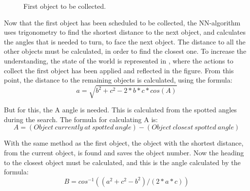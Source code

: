 \begin{figure}[H]
     \caption{\label{fig:object_navigation_first} First object to be collected.}
\end{figure}

Now that the first object has been scheduled to be collected, the NN-algorithm uses trigonometry to find the shortest distance to the next object, and calculates the angles that is needed to turn, to face the next object. The distance to all the other objects must be calculated, in order to find the closest one. To increase the understanding, the state of the world is represented in , where the actions to collect the first object has been applied and reflected in the figure. From this point, the distance to the remaining objects is calculated, using the formula:
\begin{equation}
a = \sqrt{ b^2 + c^2 - 2*b*c*cos(A) } \label{equation:a}
\end{equation}

But for this, the A angle is needed. This is calculated from the spotted angles during the search. The formula for calculating A is:
\begin{equation}
A = (Object~currently~at~spotted~angle) - (Object~closest~spotted~angle) \label{equation:AAngle}
\end{equation}

With the same method as the first object, the object with the shortest distance, from the current object, is found and saves the object number. Now the heading to the closest object must be calculated, and this is the angle calculated by the formula:
\begin{equation}
B = cos^{-1}((a^2 + c^2 - b^2)/(2*a*c)) \label{equation:B}
\end{equation}

